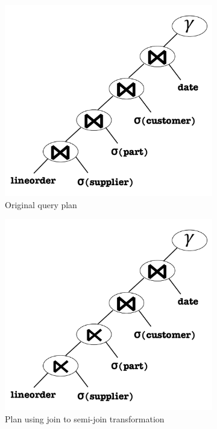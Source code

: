 \begin{figure}[t]
	\centering
	\begin{subfigure}[bt]{0.3\textwidth}
		\centering
		\includegraphics[width=1.0\textwidth,
		height=0.75\textwidth]{system/figures/Q41-original.pdf}
		\caption{Original query plan}
		\label{fig-q41-original}
	\end{subfigure} %
	\begin{subfigure}[bt]{0.3\textwidth}
		\centering
		\includegraphics[width=1.0\textwidth,
		height=0.75\textwidth]{system/figures/Q41-semijoin.pdf}
		\caption{Plan using join to semi-join transformation}
		\label{fig-q41-semijoin}
	\end{subfigure} %
	\begin{subfigure}[bt]{0.3\textwidth}

\end{subfigure}
\end{figure}

